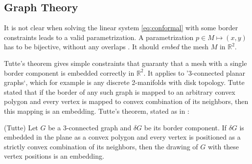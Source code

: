 \subsection{Graph Theory}

It is not clear when solving the linear system \ref{eq:conformal} with some border constraints leads to a valid parametrization. A parametrization $p\in M \mapsto (x,y)$ has to be bijective, without any overlaps . It should \emph{embed} the mesh $M$ in $\mathbb R^2$.

Tutte's theorem gives simple constraints that guaranty that a mesh with a single border component is embedded correctly in $\mathbb R^2$. It applies to '3-connected planar graphs`, which for example is any discrete 2-manifolds with disk topology. Tutte stated that if the border of any such graph is mapped to an arbitrary convex polygon and every vertex is mapped to convex combination of its neighbors, then this mapping is an embedding. Tutte's theorem, stated as in \cite{Gortler}:

\begin{thm}(Tutte)\cite{Gortler} Let $G$ be a $3$-connected graph and $\delta G$ be its border component. If $\delta G$ is embedded in the plane as a convex polygon and every vertex is positioned as a strictly convex combination of its neighbors, then the drawing of $G$ with these vertex positions is an embedding. 
\end{thm}

